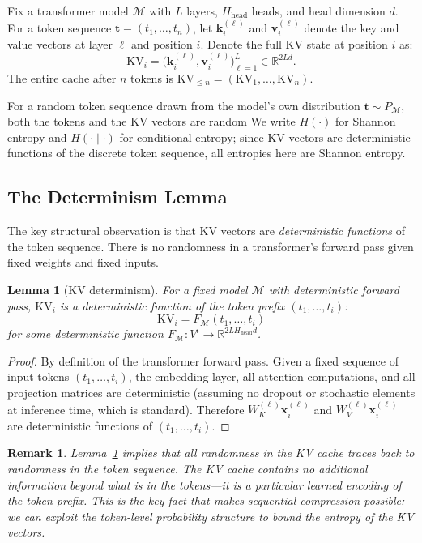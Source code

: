 \documentclass[11pt]{article}
\newtheorem{lemma}{Lemma}
\newtheorem{remark}{Remark}
\begin{document}
Fix a transformer model $\mathcal{M}$ with $L$ layers, $H_{\mathrm{head}}$ heads, and head
dimension $d$.  For a token sequence $\mathbf{t} = (t_1, \ldots, t_n)$, let
$\mathbf{k}^{(\ell)}_{i}$ and $\mathbf{v}^{(\ell)}_{i}$ denote the key and
value vectors at layer $\ell$ and position $i$.  Denote the full KV state at
position $i$ as:
\[
  \mathrm{KV}_i = \bigl(\mathbf{k}^{(\ell)}_i, \mathbf{v}^{(\ell)}_i\bigr)_{\ell=1}^{L}
  \in \mathbb{R}^{2Ld}.
\]
The entire cache after $n$ tokens is $\mathrm{KV}_{\leq n} = (\mathrm{KV}_1, \ldots, \mathrm{KV}_n)$.

For a random token sequence drawn from the model's own distribution
$\mathbf{t} \sim P_{\mathcal{M}}$, both the tokens and the KV vectors are random
We write $H(\cdot)$ for Shannon entropy and $H(\cdot \mid \cdot)$ for
conditional entropy; since KV vectors are deterministic functions of
the discrete token sequence, all entropies here are Shannon entropy.

\subsection{The Determinism Lemma}

The key structural observation is that KV vectors are \emph{deterministic functions}
of the token sequence.  There is no randomness in a transformer's forward pass
given fixed weights and fixed inputs.

\begin{lemma}[KV determinism]
\label{lem:determinism}
For a fixed model $\mathcal{M}$ with deterministic forward pass, $\mathrm{KV}_i$
is a deterministic function of the token prefix $(t_1, \ldots, t_i)$:
\[
  \mathrm{KV}_i = F_{\mathcal{M}}(t_1, \ldots, t_i)
\]
for some deterministic function $F_{\mathcal{M}}: V^i \to \mathbb{R}^{2LH_{\mathrm{head}}d}$.
\end{lemma}

\begin{proof}
By definition of the transformer forward pass.  Given a fixed sequence of input
tokens $(t_1,\ldots,t_i)$, the embedding layer, all attention computations, and
all projection matrices are deterministic (assuming no dropout or stochastic
elements at inference time, which is standard).  Therefore $W_K^{(\ell)}\mathbf{x}^{(\ell)}_i$
and $W_V^{(\ell)}\mathbf{x}^{(\ell)}_i$ are deterministic functions of
$(t_1,\ldots,t_i)$.
\end{proof}

\begin{remark}
Lemma~\ref{lem:determinism} implies that all randomness in the KV cache traces
back to randomness in the token sequence.  The KV cache contains no additional
information beyond what is in the tokens---it is a particular learned encoding
of the token prefix.  This is the key fact that makes sequential compression
possible: we can exploit the token-level probability structure to bound the
entropy of the KV vectors.
\end{remark}
\end{document}
